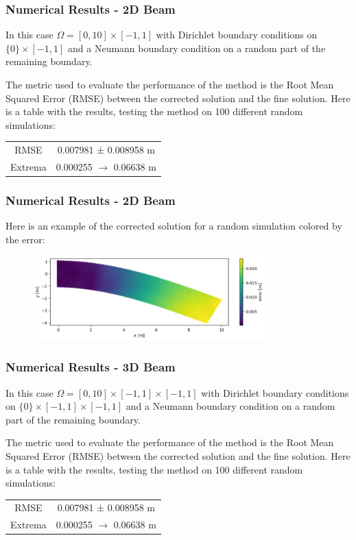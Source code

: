 \documentclass{beamer}
\begin{document}
\begin{frame}
    \frametitle{Numerical Results - 2D Beam}
    In this case \( \Omega = [0, 10] \times [-1, 1] \) with Dirichlet boundary conditions on \(\{0\} \times [-1, 1]\) and a Neumann boundary condition on a random part of the remaining boundary.
    \vspace{0.5cm}

    The metric used to evaluate the performance of the method is the Root Mean Squared Error (RMSE) between the corrected solution and the fine solution.
    Here is a table with the results, testing the method on 100 different random simulations:
    \begin{table}
        \centering
        \begin{tabular}{|c|c|}
            \hline
            RMSE & 0.007981 ± 0.008958 m \\
            Extrema & 0.000255 \(\rightarrow\) 0.06638 m \\
            \hline
        \end{tabular}
    \end{table}
\end{frame}

\begin{frame}
    \frametitle{Numerical Results - 2D Beam}
    Here is an example of the corrected solution for a random simulation colored by the error:
    \begin{figure}
        \centering
        \includegraphics[width=0.8\textwidth]{Images/output_2D_beam.png}
    \end{figure}
\end{frame}

\begin{frame}
    \frametitle{Numerical Results - 3D Beam}
    In this case \( \Omega = [0, 10] \times [-1, 1] \times [-1, 1] \) with Dirichlet boundary conditions on \(\{0\} \times [-1, 1] \times [-1, 1]\) and a Neumann boundary condition on a random part of the remaining boundary.
    \vspace{0.5cm}

    The metric used to evaluate the performance of the method is the Root Mean Squared Error (RMSE) between the corrected solution and the fine solution.
    Here is a table with the results, testing the method on 100 different random simulations:
    \begin{table}
        \centering
        \begin{tabular}{|c|c|}
            \hline
            RMSE & 0.007981 ± 0.008958 m \\
            Extrema & 0.000255 \(\rightarrow\) 0.06638 m \\
            \hline
        \end{tabular}
    \end{table}
\end{frame}
\end{document}
